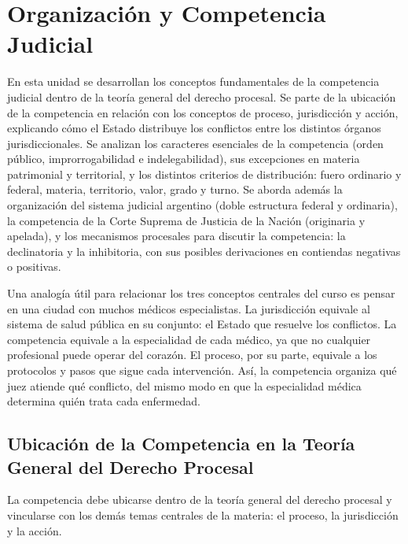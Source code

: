 \documentclass[12pt,oneside]{book}
\begin{document}

\chapter{Organización y Competencia Judicial}

En esta unidad se desarrollan los conceptos fundamentales de la competencia judicial dentro de la teoría general del derecho procesal. Se parte de la ubicación de la competencia en relación con los conceptos de proceso, jurisdicción y acción, explicando cómo el Estado distribuye los conflictos entre los distintos órganos jurisdiccionales. Se analizan los caracteres esenciales de la competencia (orden público, improrrogabilidad e indelegabilidad), sus excepciones en materia patrimonial y territorial, y los distintos criterios de distribución: fuero ordinario y federal, materia, territorio, valor, grado y turno. Se aborda además la organización del sistema judicial argentino (doble estructura federal y ordinaria), la competencia de la Corte Suprema de Justicia de la Nación (originaria y apelada), y los mecanismos procesales para discutir la competencia: la declinatoria y la inhibitoria, con sus posibles derivaciones en contiendas negativas o positivas.

\begin{note}
Una analogía útil para relacionar los tres conceptos centrales del curso es pensar en una ciudad con muchos médicos especialistas. La jurisdicción equivale al sistema de salud pública en su conjunto: el Estado que resuelve los conflictos. La competencia equivale a la especialidad de cada médico, ya que no cualquier profesional puede operar del corazón. El proceso, por su parte, equivale a los protocolos y pasos que sigue cada intervención. Así, la competencia organiza qué juez atiende qué conflicto, del mismo modo en que la especialidad médica determina quién trata cada enfermedad.
\end{note}

\section{Ubicación de la Competencia en la Teoría General del Derecho Procesal}

La competencia debe ubicarse dentro de la teoría general del derecho procesal y vincularse con los demás temas centrales de la materia: el proceso, la jurisdicción y la acción.
\end{document}

